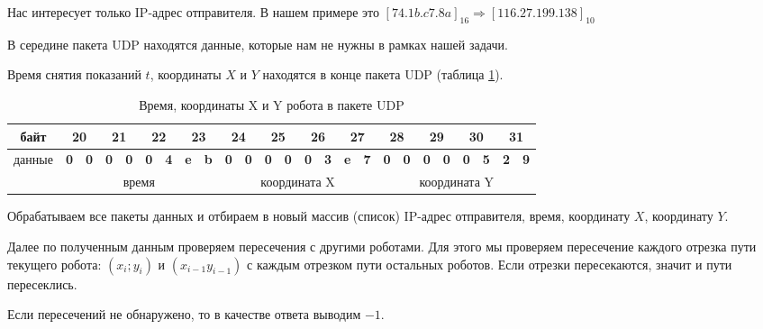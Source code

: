 Нас интересует только IP-адрес отправителя. В нашем примере это $[74.1b.c7.8a]_{16} \Rightarrow [116.27.199.138]_{10}$ 

В середине пакета UDP находятся данные, которые нам не нужны в рамках нашей задачи.

Время снятия показаний $t$, координаты $X$ и $Y$ находятся в конце пакета UDP (таблица \ref{table:01_Found_intersects_02}).

\begin{table}[h!]
	\begin{center}
		\begin{tabular}{|c|c|c|c|c|c|c|c|c|c|c|c|c|c|c|c|c|c|c|c|c|c|c|c|c|}
			\hline
			байт   & \multicolumn{2}{c|}{20} & \multicolumn{2}{c|}{21} & \multicolumn{2}{c|}{22} & \multicolumn{2}{c|}{23} & \multicolumn{2}{c|}{24} & \multicolumn{2}{c|}{25} & \multicolumn{2}{c|}{26} & \multicolumn{2}{c|}{27} & \multicolumn{2}{c|}{28} & \multicolumn{2}{c|}{29} & \multicolumn{2}{c|}{30} & \multicolumn{2}{c|}{31} \\ \hline
			данные & \textbf{0} & \textbf{0} & \textbf{0} & \textbf{0} & \textbf{0} & \textbf{4} & \textbf{e} & \textbf{b} & \textbf{0} & \textbf{0} & \textbf{0} & \textbf{0} & \textbf{0} & \textbf{3} & \textbf{e} & \textbf{7} & \textbf{0} & \textbf{0} & \textbf{0} & \textbf{0} & \textbf{0} & \textbf{5} & \textbf{2} & \textbf{9} \\ \hline
			& \multicolumn{8}{c|}{время}                                                                            & \multicolumn{8}{c|}{координата X}                                                                     & \multicolumn{8}{c|}{координата Y}                                                                     \\ \hline
		\end{tabular}
		\caption{Время, координаты X и Y робота в пакете UDP}
		\label{table:01_Found_intersects_02}
	\end{center}
\end{table}

Обрабатываем все пакеты данных и отбираем в новый массив (список) IP-адрес отправителя, время, координату $X$, координату $Y$.

Далее по полученным данным проверяем пересечения с другими роботами. Для этого мы проверяем пересечение каждого отрезка пути текущего робота: $(x_i;y_i)$ и $(x_{i-1} y_{i-1})$ с каждым отрезком пути остальных роботов. Если отрезки пересекаются, значит и пути пересеклись. 

Если пересечений не обнаружено, то в качестве ответа выводим $-1$.

